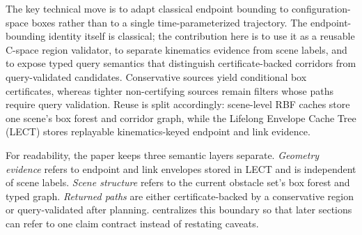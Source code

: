 \documentclass[journal]{IEEEtran}
\DeclareRobustCommand{\textsc}[1]{\textnormal{\MakeUppercase{#1}}}
\newcommand{\rbf}{\textsc{RBF}}
\newcommand{\cspace}{\mbox{C-space}}
\begin{document}
The key technical move is to adapt classical endpoint bounding to
configuration-space boxes rather than to a single time-parameterized trajectory.
The endpoint-bounding identity itself is classical;
the contribution here is to use it as a reusable \cspace{} region validator,
to separate kinematics evidence from scene labels, and to expose typed query
semantics that distinguish certificate-backed corridors from query-validated
candidates. Conservative sources yield conditional box certificates, whereas
tighter non-certifying sources remain filters whose paths require query
validation. Reuse is split accordingly: scene-level \rbf{} caches store one
scene's box forest and corridor graph, while the Lifelong Envelope Cache Tree
(LECT) stores replayable kinematics-keyed endpoint and link evidence.

For readability, the paper keeps three semantic layers separate.
\emph{Geometry evidence} refers to endpoint and link envelopes stored in LECT and
is independent of scene labels. \emph{Scene structure} refers to the current
obstacle set's box forest and typed graph. \emph{Returned paths} are either
certificate-backed by a conservative region or query-validated after planning.
 centralizes this boundary so that later sections can
refer to one claim contract instead of restating caveats.
\end{document}
